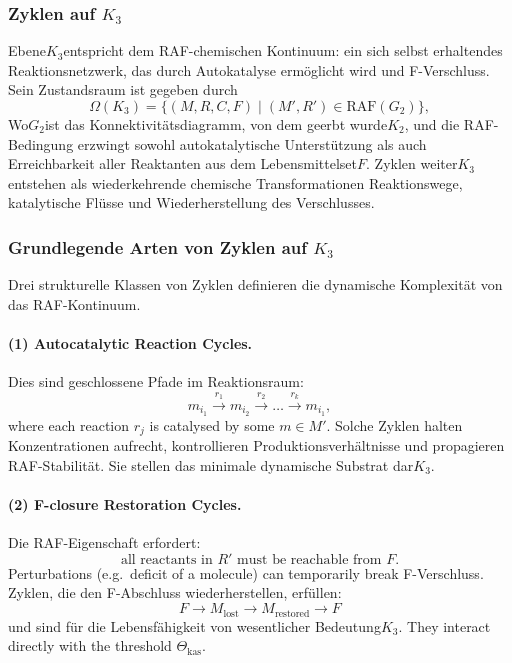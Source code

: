 
\subsubsection{Zyklen auf \texorpdfstring{$K_3$}{K_3}}
\label{sec:cycles-k3}

Ebene$K_3$entspricht dem RAF-chemischen Kontinuum:
ein sich selbst erhaltendes Reaktionsnetzwerk, das durch Autokatalyse ermöglicht wird und
F-Verschluss.
Sein Zustandsraum ist gegeben durch
\[
  \Omega(K_3) = \{(M,R,C,F)\mid (M',R')\in \mathrm{RAF}(G_2)\},
\]
Wo$G_2$ist das Konnektivitätsdiagramm, von dem geerbt wurde$K_2$,
und die RAF-Bedingung erzwingt sowohl autokatalytische Unterstützung als auch Erreichbarkeit
aller Reaktanten aus dem Lebensmittelset$F$.
Zyklen weiter$K_3$entstehen als wiederkehrende chemische Transformationen
Reaktionswege, katalytische Flüsse und Wiederherstellung des Verschlusses.

\subsubsection{Grundlegende Arten von Zyklen auf \texorpdfstring{$K_3$}{K_3}}

Drei strukturelle Klassen von Zyklen definieren die dynamische Komplexität von
das RAF-Kontinuum.

\paragraph{(1) Autocatalytic Reaction Cycles.}

Dies sind geschlossene Pfade im Reaktionsraum:
\[
  m_{i_1}\xrightarrow{r_1} m_{i_2}
    \xrightarrow{r_2} \dots
    \xrightarrow{r_k} m_{i_1},
\]
where each reaction $r_j$ is catalysed by some $m\in M'$.
Solche Zyklen halten Konzentrationen aufrecht, kontrollieren Produktionsverhältnisse und
propagieren RAF-Stabilität.
Sie stellen das minimale dynamische Substrat dar$K_3$.

\paragraph{(2) F-closure Restoration Cycles.}

Die RAF-Eigenschaft erfordert:
\[
  \text{all reactants in } R' \text{ must be reachable from } F.
\]
Perturbations (e.g.\ deficit of a molecule) can temporarily break
F-Verschluss.
Zyklen, die den F-Abschluss wiederherstellen, erfüllen:
\[
  F \to M_{\mathrm{lost}} \to M_{\mathrm{restored}} \to F
\]
und sind für die Lebensfähigkeit von wesentlicher Bedeutung$K_3$.
They interact directly with the threshold $\Theta_{\mathrm{kas}}$.

